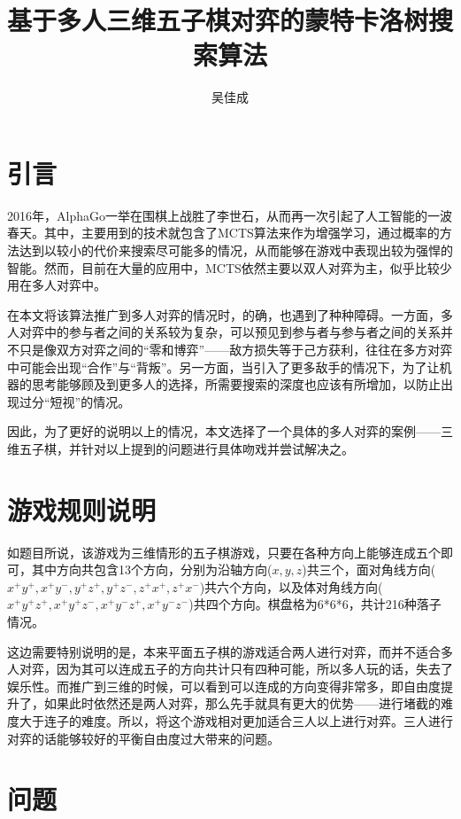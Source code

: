 \documentclass[9pt,twocolumn,twoside]{osajnl}
\title{基于多人三维五子棋对弈的蒙特卡洛树搜索算法}
\author[1]{吴佳成}
\affil[1]{南开大学，软件学院，软件工程专业，三班，1412649}
\begin{document}
\maketitle

\section{引言}

2016年，AlphaGo\cite{AlphaGo}一举在围棋上战胜了李世石，从而再一次引起了人工智能的一波春天。其中，主要用到的技术就包含了MCTS算法来作为增强学习，通过概率的方法达到以较小的代价来搜索尽可能多的情况，从而能够在游戏中表现出较为强悍的智能。然而，目前在大量的应用中，MCTS依然主要以双人对弈为主，似乎比较少用在多人对弈中。

在本文将该算法推广到多人对弈的情况时，的确，也遇到了种种障碍。一方面，多人对弈中的参与者之间的关系较为复杂，可以预见到参与者与参与者之间的关系并不只是像双方对弈之间的“零和博弈”——敌方损失等于己方获利，往往在多方对弈中可能会出现“合作”与“背叛”。另一方面，当引入了更多敌手的情况下，为了让机器的思考能够顾及到更多人的选择，所需要搜索的深度也应该有所增加，以防止出现过分“短视”的情况。

因此，为了更好的说明以上的情况，本文选择了一个具体的多人对弈的案例——三维五子棋，并针对以上提到的问题进行具体吻戏并尝试解决之。

\section{游戏规则说明}

如题目所说，该游戏为三维情形的五子棋游戏，只要在各种方向上能够连成五个即可，其中方向共包含13个方向，分别为沿轴方向($x,y,z$)共三个，面对角线方向($x^+y^+,x^+y^-,y^+z^+,y^+z^-,z^+x^+,z^+x^-$)共六个方向，以及体对角线方向($x^+y^+z^+,x^+y^+z^-,x^+y^-z^+,x^+y^-z^-$)共四个方向。棋盘格为6*6*6，共计216种落子情况。

这边需要特别说明的是，本来平面五子棋的游戏适合两人进行对弈，而并不适合多人对弈，因为其可以连成五子的方向共计只有四种可能，所以多人玩的话，失去了娱乐性。而推广到三维的时候，可以看到可以连成的方向变得非常多，即自由度提升了，如果此时依然还是两人对弈，那么先手就具有更大的优势——进行堵截的难度大于连子的难度。所以，将这个游戏相对更加适合三人以上进行对弈。三人进行对弈的话能够较好的平衡自由度过大带来的问题。

\section{问题}
\end{document}
